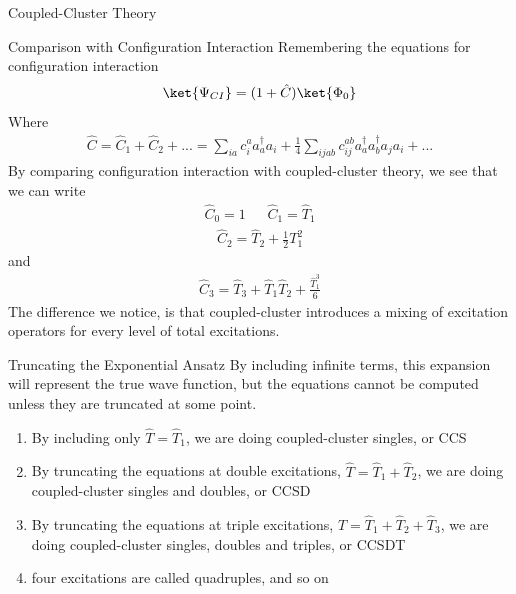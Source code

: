 \documentclass[twoside,english]{uiofysmaster}
\begin{document}
\begin{chapter}{Coupled-Cluster Theory}
\begin{section}{Comparison with Configuration Interaction}
	  	Remembering the equations for configuration interaction
	  	\begin{align}
	  		\ket{\Psi_{CI}} = (1 + \hat C) \ket{\Phi_0} 
	   	\end{align}
	   	Where
	  	\begin{align}
	  		\hat C = \hat C_1 + \hat C_2 + ... =  \sum_{ia} c_i^a a_a^{\dagger} a_i + \frac{1}{4} \sum_{ijab} c_{ij}^{ab} a_a^{\dagger} a_b^{\dagger} a_j a_i + ...
	   	\end{align}
	   	By comparing configuration interaction with coupled-cluster theory, we see that we can write
	   	\begin{align}
	   		\hat C_0 = 1 \:\:\:\:\:\:\: \hat C_1 = \hat T_1 
	   	\end{align}
	   	\begin{align}
	   		\hat C_2 = \hat T_2 + \frac{1}{2} T_1^2
	   	\end{align}
	   	and 
	   	\begin{align}
	   		\hat C_3 = \hat T_3 + \hat T_1 \hat T_2 + \frac{\hat T_1^3}{6}
	   	\end{align}
	   	The difference we notice, is that coupled-cluster introduces a mixing of excitation operators for every level of total excitations. 
 	\end{section}

	\begin{section}{Truncating the Exponential Ansatz}
	  	By including infinite terms, this expansion will represent the true wave function, but the equations cannot be computed unless they are truncated at some point. 
	  	\begin{enumerate}
	  		\item By including only $\hat T = \hat T_1$, we are doing coupled-cluster singles, or CCS
	  		\item By truncating the equations at double excitations, $\hat T = \hat T_1 + \hat T_2$, we are doing coupled-cluster singles and doubles, or CCSD
	  		\item By truncating the equations at triple excitations, $\hat T = \hat T_1 + \hat T_2 + \hat T_3$, we are doing coupled-cluster singles, doubles and 		triples, or CCSDT 
	  		\item four excitations are called quadruples, and so on
	  	\end{enumerate}


\end{section}
\end{chapter}
\end{document}
